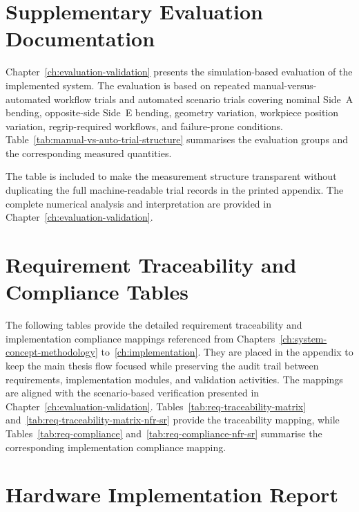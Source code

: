 \section{Supplementary Evaluation Documentation}
\label{app:supplementary-evaluation}

Chapter~\ref{ch:evaluation-validation} presents the simulation-based
evaluation of the implemented system. The evaluation is based on repeated
manual-versus-automated workflow trials and automated scenario trials covering
nominal Side~A bending, opposite-side Side~E bending, geometry variation,
workpiece position variation, regrip-required workflows, and failure-prone
conditions. Table~\ref{tab:manual-vs-auto-trial-structure} summarises the
evaluation groups and the corresponding measured quantities.



The table is included to make the measurement structure transparent without
duplicating the full machine-readable trial records in the printed appendix.
The complete numerical analysis and interpretation are provided in
Chapter~\ref{ch:evaluation-validation}.

\section{Requirement Traceability and Compliance Tables}
\label{app:req-traceability-compliance}

The following tables provide the detailed requirement traceability and
implementation compliance mappings referenced from
Chapters~\ref{ch:system-concept-methodology} to~\ref{ch:implementation}.
They are placed in the appendix to keep the main thesis flow focused while
preserving the audit trail between requirements, implementation modules, and
validation activities. The mappings are aligned with the scenario-based
verification presented in Chapter~\ref{ch:evaluation-validation}. Tables~\ref{tab:req-traceability-matrix}
and~\ref{tab:req-traceability-matrix-nfr-sr} provide the traceability mapping,
while Tables~\ref{tab:req-compliance} and~\ref{tab:req-compliance-nfr-sr}
summarise the corresponding implementation compliance mapping.





\section{Hardware Implementation Report}
\label{app:hardware-implementation-report}

